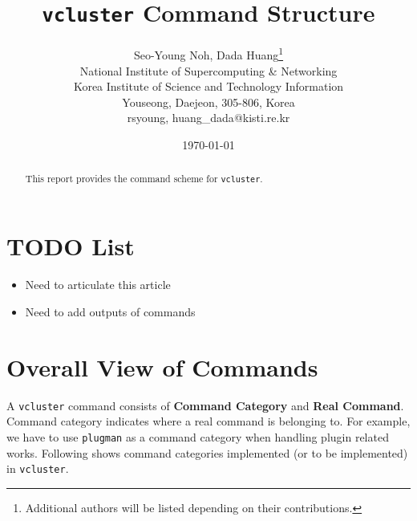 \documentclass[11pt]{article}
\def \ttt{\texttt}
\def \tbf{\textbf}
\def \vb{\verb}
\begin{document}
\title{\ttt{vcluster} Command Structure}
\author{
        Seo-Young Noh, Dada Huang\thanks{Additional authors will be listed depending on their contributions.} \\
        $ $\\
        National Institute of Supercomputing \& Networking\\
        Korea Institute of Science and Technology Information\\
        Youseong, Daejeon, 305-806, Korea\\
        {rsyoung, huang\_dada}@kisti.re.kr
}
\date{\today}



\maketitle

\begin{abstract}
This report provides the command scheme for \ttt{vcluster}.
\end{abstract}


\section{TODO List}

\begin{itemize}
 \item Need to articulate this article
 \item Need to add outputs of commands
\end{itemize}




\section{Overall View of Commands}

A \vb+vcluster+ command consists of \tbf{Command Category} and \tbf{Real Command}. Command category indicates where a real command is belonging to. For example, we have to use \vb+plugman+ as a command category when handling plugin related works. Following shows command categories implemented (or to be implemented) in \vb+vcluster+.
\end{document}
